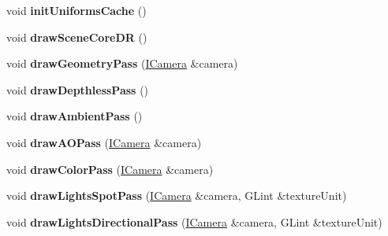 \begin{DoxyCompactItemize}
\item 
void {\bfseries init\+Uniforms\+Cache} ()\hypertarget{classflw_1_1flf_1_1RendererDR_a4a06e01841f3b48d138f5bd0904fa150}{}\label{classflw_1_1flf_1_1RendererDR_a4a06e01841f3b48d138f5bd0904fa150}

\item 
void {\bfseries draw\+Scene\+Core\+DR} ()\hypertarget{classflw_1_1flf_1_1RendererDR_aef4f2d788450a34f1df7e037c418c840}{}\label{classflw_1_1flf_1_1RendererDR_aef4f2d788450a34f1df7e037c418c840}

\item 
void {\bfseries draw\+Geometry\+Pass} (\hyperlink{classflw_1_1flf_1_1ICamera}{I\+Camera} \&camera)\hypertarget{classflw_1_1flf_1_1RendererDR_ac64ac1f3331fe2a531bbe375e81d77a6}{}\label{classflw_1_1flf_1_1RendererDR_ac64ac1f3331fe2a531bbe375e81d77a6}

\item 
void {\bfseries draw\+Depthless\+Pass} ()\hypertarget{classflw_1_1flf_1_1RendererDR_a37a822463882acbbac59e9052b08a742}{}\label{classflw_1_1flf_1_1RendererDR_a37a822463882acbbac59e9052b08a742}

\item 
void {\bfseries draw\+Ambient\+Pass} ()\hypertarget{classflw_1_1flf_1_1RendererDR_a46b49427c7d1a42c55e64b70e16d4d4d}{}\label{classflw_1_1flf_1_1RendererDR_a46b49427c7d1a42c55e64b70e16d4d4d}

\item 
void {\bfseries draw\+A\+O\+Pass} (\hyperlink{classflw_1_1flf_1_1ICamera}{I\+Camera} \&camera)\hypertarget{classflw_1_1flf_1_1RendererDR_a99d0d74fffca7965d9e264dd89fd0cf7}{}\label{classflw_1_1flf_1_1RendererDR_a99d0d74fffca7965d9e264dd89fd0cf7}

\item 
void {\bfseries draw\+Color\+Pass} (\hyperlink{classflw_1_1flf_1_1ICamera}{I\+Camera} \&camera)\hypertarget{classflw_1_1flf_1_1RendererDR_a1c7fb1ab235284eeb1eb87457dc3efc5}{}\label{classflw_1_1flf_1_1RendererDR_a1c7fb1ab235284eeb1eb87457dc3efc5}

\item 
void {\bfseries draw\+Lights\+Spot\+Pass} (\hyperlink{classflw_1_1flf_1_1ICamera}{I\+Camera} \&camera, G\+Lint \&texture\+Unit)\hypertarget{classflw_1_1flf_1_1RendererDR_a1535e73ea46bb22716ea72a25665a89b}{}\label{classflw_1_1flf_1_1RendererDR_a1535e73ea46bb22716ea72a25665a89b}

\item 
void {\bfseries draw\+Lights\+Directional\+Pass} (\hyperlink{classflw_1_1flf_1_1ICamera}{I\+Camera} \&camera, G\+Lint \&texture\+Unit)\hypertarget{classflw_1_1flf_1_1RendererDR_a2f9c1e7c6afdfa484bd3428e0fd84ad3}{}\label{classflw_1_1flf_1_1RendererDR_a2f9c1e7c6afdfa484bd3428e0fd84ad3}


\end{DoxyCompactItemize}
